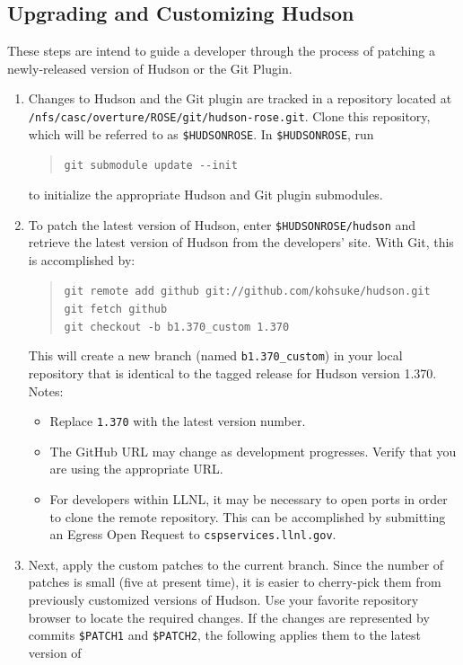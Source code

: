 \subsection{Upgrading and Customizing Hudson}
These steps are intend to guide a developer through the process of
patching a newly-released version of Hudson or the Git Plugin.
\begin{enumerate}
\item{
Changes to Hudson and the Git plugin are tracked in a repository located
at \texttt{/nfs/casc/overture/ROSE/git/hudson-rose.git}. Clone
this repository, which will be referred to as \texttt{\$HUDSONROSE}. In
\texttt{\$HUDSONROSE}, run 
\begin{quote}
\texttt{git submodule update -{}-init}
\end{quote}
to initialize the appropriate Hudson and Git plugin submodules.  
}
\item{
To patch the latest version of Hudson, enter \texttt{\$HUDSONROSE/hudson}
and retrieve the latest version of Hudson from the developers' site. With Git,
this is accomplished by:
  \begin{quote}
  \texttt{git remote add github git://github.com/kohsuke/hudson.git \\
    git fetch github \\
    git checkout -b b1.370\_custom 1.370
  }
  \end{quote}
This will create a new branch (named \texttt{b1.370\_custom}) in your
local repository that is identical to the tagged release for Hudson
version 1.370. Notes: 
  \begin{itemize}
  \item{Replace \texttt{1.370} with the latest version number.}
  \item{The GitHub URL may change as development progresses.
Verify that you are using the appropriate URL.}
  \item{For developers within LLNL, it may be necessary to open ports in order to
clone the remote repository. This can be accomplished by submitting an Egress 
Open Request to \texttt{cspservices.llnl.gov}.}
  \end{itemize}
}
\item{
Next, apply the custom patches to the current branch. Since the number
of patches is small (five at present time), it is easier to
cherry-pick them from previously customized versions of Hudson. Use your
favorite repository browser to locate the required changes. If the
changes are represented by commits \texttt{\$PATCH1} and
\texttt{\$PATCH2}, the following applies them to the latest version of
}
\end{enumerate}
